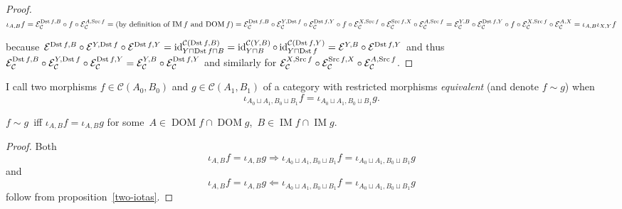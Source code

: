 \begin{proof}
  $\iota_{A, B} f =\mathcal{E}_{\mathcal{C}}^{\operatorname{Dst} f, B} \circ f \circ
  \mathcal{E}_{\mathcal{C}}^{A, \operatorname{Src} f} = \text{(by definition of
  $\operatorname{IM} f$ and $\operatorname{DOM} f$)} =\mathcal{E}_{\mathcal{C}}^{\operatorname{Dst} f,
  B} \circ \mathcal{E}_{\mathcal{C}}^{Y, \operatorname{Dst} f} \circ
  \mathcal{E}_{\mathcal{C}}^{\operatorname{Dst} f, Y} \circ f \circ
  \mathcal{E}_{\mathcal{C}}^{X, \operatorname{Src} f} \circ
  \mathcal{E}_{\mathcal{C}}^{\operatorname{Src} f, X} \circ
  \mathcal{E}_{\mathcal{C}}^{A, \operatorname{Src} f} =\mathcal{E}_{\mathcal{C}}^{Y,
  B} \circ \mathcal{E}_{\mathcal{C}}^{\operatorname{Dst} f, Y} \circ f \circ
  \mathcal{E}_{\mathcal{C}}^{X, \operatorname{Src} f} \circ
  \mathcal{E}_{\mathcal{C}}^{A, X} = \iota_{A, B} \iota_{X, Y} f$
  
  because $\mathcal{E}^{\operatorname{Dst} f, B} \circ \mathcal{E}^{Y, \operatorname{Dst} f}
  \circ \mathcal{E}^{\operatorname{Dst} f, Y} = \operatorname{id}^{\mathcal{C}(\operatorname{Dst} f, B)}_{Y \sqcap
  \operatorname{Dst} f \sqcap B} = \operatorname{id}^{\mathcal{C}(Y, B)}_{Y \sqcap B} \circ \operatorname{id}^{\mathcal{C}(\operatorname{Dst} f,Y)}_{Y \sqcap \operatorname{Dst} f} = \mathcal{E}^{Y, B} \circ
  \mathcal{E}^{\operatorname{Dst} f, Y}$ and thus
  $\mathcal{E}_{\mathcal{C}}^{\operatorname{Dst} f, B} \circ
  \mathcal{E}_{\mathcal{C}}^{Y, \operatorname{Dst} f} \circ
  \mathcal{E}_{\mathcal{C}}^{\operatorname{Dst} f, Y} =\mathcal{E}_{\mathcal{C}}^{Y,
  B} \circ \mathcal{E}_{\mathcal{C}}^{\operatorname{Dst} f, Y}$ and similarly for
  $\mathcal{E}_{\mathcal{C}}^{X, \operatorname{Src} f} \circ
  \mathcal{E}_{\mathcal{C}}^{\operatorname{Src} f, X} \circ
  \mathcal{E}_{\mathcal{C}}^{A, \operatorname{Src} f}$.
\end{proof}

\begin{defn}
I call two morphisms $f\in\mathcal{C}(A_0,B_0)$ and
$g\in\mathcal{C}(A_1,B_1)$
of a category with restricted morphisms \emph{equivalent}
(and denote $f\sim g$) when
\[\iota_{A_0\sqcup A_1,B_0\sqcup B_1}f=\iota_{A_0\sqcup A_1,B_0\sqcup B_1}g.\]
\end{defn}

\begin{prop}
$f\sim g$~iff $\iota_{A,B}f=\iota_{A,B}g$ for
some~$A\in\operatorname{DOM}f\cap\operatorname{DOM}g$,~$B\in\operatorname{IM}f\cap\operatorname{IM}g$.
\end{prop}

\begin{proof}
Both
\[\iota_{A,B}f=\iota_{A,B}g\Rightarrow
\iota_{A_0\sqcup A_1,B_0\sqcup B_1}f=\iota_{A_0\sqcup A_1,B_0\sqcup B_1}g\]
and
\[\iota_{A,B}f=\iota_{A,B}g\Leftarrow
\iota_{A_0\sqcup A_1,B_0\sqcup B_1}f=\iota_{A_0\sqcup A_1,B_0\sqcup B_1}g\]
follow from proposition~\ref{two-iotas}.
\end{proof}

